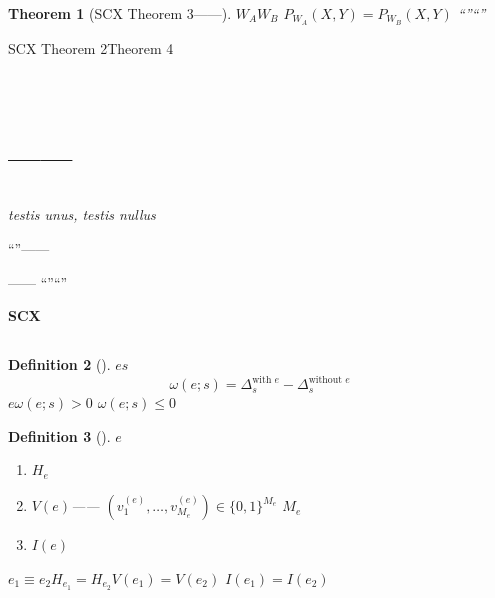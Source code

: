 \documentclass[11pt,a4paper]{article}
\newtheorem{theorem}{Theorem}[section]
\newtheorem{definition}[theorem]{Definition}
\theoremstyle{remark}
\begin{document}
\begin{theorem}[SCX Theorem 3——]
\label{thm:scx3}
$W_A$$W_B$
$P_{W_A}(X, Y) = P_{W_B}(X, Y)$
``''``''
\end{theorem}

SCX Theorem 2Theorem 4

\section{\\
         \large ——}

\subsection{}


\textit{testis unus, testis nullus}

``''——\textbf{}\textbf{}


——
``''``''

\textbf{SCX}


\subsection{}

\begin{definition}[]
\label{def:evidence_weight}
$e$$s$\textbf{}
\begin{equation}
    \boxed{\omega(e; s) = \Delta_s^{\text{with } e} - \Delta_s^{\text{without } e}}
\end{equation}
$e$$\omega(e; s) > 0$
$\omega(e; s) \leq 0$
\end{definition}

\begin{definition}[]
\label{def:evidence_components}
$e$
\begin{enumerate}[label=(\roman*)]
    \item \textbf{}$H_e$
    \item \textbf{}$V(e)$——
          $(v_1^{(e)}, \ldots, v_{M_e}^{(e)}) \in \{0,1\}^{M_e}$
          $M_e$
    \item \textbf{}$I(e)$
          
\end{enumerate}
$e_1 \equiv e_2$$H_{e_1} = H_{e_2}$$V(e_1) = V(e_2)$
$I(e_1) = I(e_2)$
\end{definition}
\end{document}
